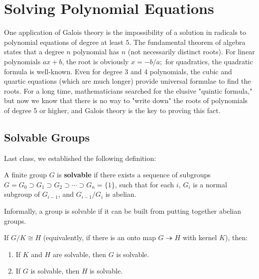 


\section{Solving Polynomial Equations}

One application of Galois theory is the impossibility of a solution in radicals to polynomial equations of degree at least $5$. The fundamental theorem of algebra states that a degree $n$ polynomial has $n$ (not necessarily distinct roots). For linear polynomials $ax + b$, the root is obviously $x = -b/a;$ for quadratics, the quadratic formula is well-known. Even for degree 3 and 4 polynomials, the cubic and quartic equations (which are much longer) provide universal formulae to find the roots. For a long time, mathematicians searched for the elusive "quintic formula," but now we know that there is no way to "write down" the roots of polynomials of degree 5 or higher, and Galois theory is the key to proving this fact.

\subsection{Solvable Groups}

Last class, we established the following definition:

\begin{definition}
    A finite group $G$ is \textbf{solvable} if there exists a sequence of subgroups $G = G_0 \supset G_1 \supset G_2 \supset \cdots \supset G_n = \{1\}$, such that for each $i$, $G_i$ is a normal subgroup of $G_{i - 1}$, and $G_{i - 1}/G_i$ is abelian. 
\end{definition}

Informally, a group is solvable if it can be built from putting together abelian groups. 

\begin{lemma}
    If $G/K \cong H$ (equivalently, if there is an onto map $G \twoheadrightarrow H$ with kernel $K$), then:
    \begin{enumerate}
        \item If $K$ and $H$ are solvable, then $G$ is solvable. 
        \item If $G$ is solvable, then $H$ is solvable. 
    \end{enumerate}
\end{lemma}


